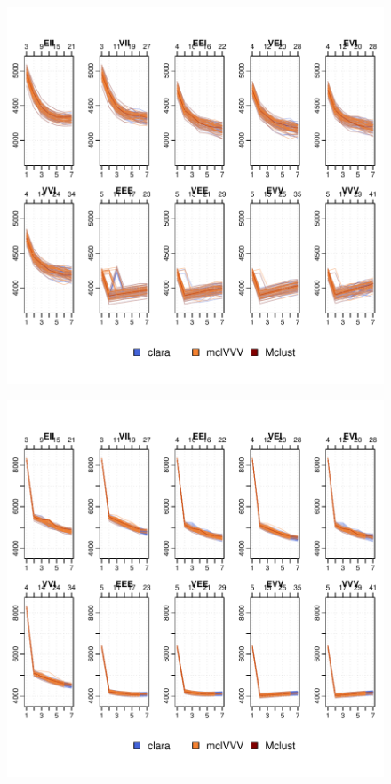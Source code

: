 \begin{figure}
    \centering
\includegraphics{App_plots-009}
\end{figure}

\begin{figure}
    \centering
\includegraphics{App_plots-010}
\end{figure}

